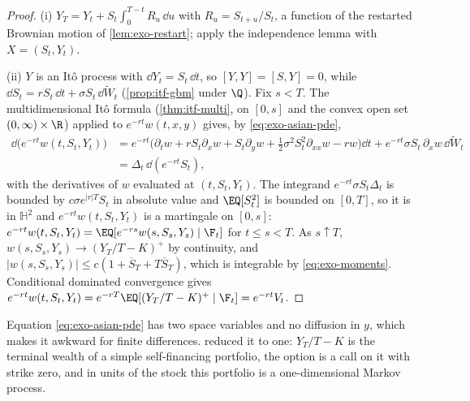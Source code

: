 \begin{proof}
(i) $Y_T=Y_t+S_t\int_0^{T-t}R_u\,\dd u$ with $R_u=S_{t+u}/S_t$, a function of the restarted
Brownian motion of \cref{lem:exo-restart}; apply the independence lemma with $X=(S_t,Y_t)$.

(ii) $Y$ is an It\^o process with $\dd Y_t=S_t\,\dd t$, so $[Y,Y]=[S,Y]=0$, while
$\dd S_t=rS_t\,\dd t+\sigma S_t\,\dd\widetilde W_t$ (\cref{prop:itf-gbm} under $\Q$). Fix $s<T$. The
multidimensional It\^o formula (\cref{thm:itf-multi}, on $[0,s]$ and the convex open set
$(0,\infty)\times\R$) applied to $e^{-rt}w(t,x,y)$ gives, by \eqref{eq:exo-asian-pde},
\begin{align*}
  \dd\big(e^{-rt}w(t,S_t,Y_t)\big)&=e^{-rt}\big(\partial_tw+rS_t\partial_xw+S_t\partial_yw
  +\tfrac12\sigma^2S_t^2\partial_{xx}w-rw\big)\dd t+e^{-rt}\sigma S_t\,\partial_xw\,\dd\widetilde W_t\\
  &=\Delta_t\,\dd(e^{-rt}S_t),
\end{align*}
with the derivatives of $w$ evaluated at $(t,S_t,Y_t)$.
The integrand $e^{-rt}\sigma S_t\Delta_t$ is bounded by $c\sigma e^{|r|T}S_t$ in absolute value and
$\EQ[S_t^2]$ is bounded on $[0,T]$, so it is in $\mathbb H^2$ and $e^{-rt}w(t,S_t,Y_t)$ is a
martingale on $[0,s]$: $e^{-rt}w(t,S_t,Y_t)=\EQ[e^{-rs}w(s,S_s,Y_s)\mid\F_t]$ for $t\le s<T$. As
$s\uparrow T$, $w(s,S_s,Y_s)\to(Y_T/T-K)^+$ by continuity, and $|w(s,S_s,Y_s)|\le
c(1+\overline S_T+T\overline S_T)$, which is integrable by \eqref{eq:exo-moments}. Conditional
dominated convergence gives $e^{-rt}w(t,S_t,Y_t)=e^{-rT}\EQ[(Y_T/T-K)^+\mid\F_t]=e^{-rt}V_t$.
\end{proof}

Equation \eqref{eq:exo-asian-pde} has two space variables and no diffusion in $y$, which makes it
awkward for finite differences. \textcite{vecer-2001} reduced it to one: $Y_T/T-K$ is the terminal
wealth of a simple self-financing portfolio, the option is a call on it with strike zero, and in
units of the stock this portfolio is a one-dimensional Markov process.


